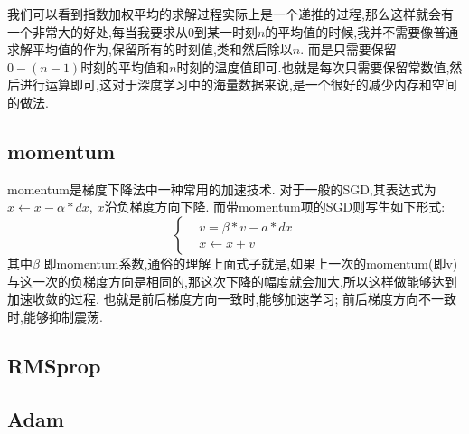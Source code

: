 我们可以看到指数加权平均的求解过程实际上是一个递推的过程,那么这样就会有一个非常大的好处,每当我要求从$0$到某一时刻$n$的平均值的时候,我并不需要像普通求解平均值的作为,保留所有的时刻值,类和然后除以$n$.
而是只需要保留$0 - (n-1)$时刻的平均值和$n$时刻的温度值即可.也就是每次只需要保留常数值,然后进行运算即可,这对于深度学习中的海量数据来说,是一个很好的减少内存和空间的做法.

\subsection{momentum}
momentum是梯度下降法中一种常用的加速技术.
对于一般的SGD,其表达式为$x \leftarrow  x-\alpha \ast dx$, $x$沿负梯度方向下降.
而带momentum项的SGD则写生如下形式:
$$
\left\{
\begin{aligned}
	& v = \beta \ast v - a \ast dx \\
	& x \leftarrow x + v
\end{aligned}
\right.
$$
其中$\beta$ 即momentum系数,通俗的理解上面式子就是,如果上一次的momentum(即v)与这一次的负梯度方向是相同的,那这次下降的幅度就会加大,所以这样做能够达到加速收敛的过程.
也就是前后梯度方向一致时,能够加速学习; 前后梯度方向不一致时,能够抑制震荡.

\subsection{RMSprop}

\subsection{Adam}

